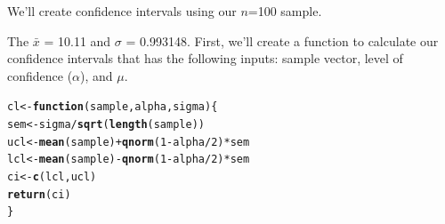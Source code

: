 \documentclass{tufte-handout}\usepackage[]{graphicx}\usepackage[]{color}
\makeatletter
\newcommand{\hlnum}[1]{\textcolor[rgb]{0.686,0.059,0.569}{#1}}%
\newcommand{\hlopt}[1]{\textcolor[rgb]{0,0,0}{#1}}%
\newcommand{\hlstd}[1]{\textcolor[rgb]{0.345,0.345,0.345}{#1}}%
\newcommand{\hlkwa}[1]{\textcolor[rgb]{0.161,0.373,0.58}{\textbf{#1}}}%
\newcommand{\hlkwb}[1]{\textcolor[rgb]{0.69,0.353,0.396}{#1}}%
\newcommand{\hlkwc}[1]{\textcolor[rgb]{0.333,0.667,0.333}{#1}}%
\newcommand{\hlkwd}[1]{\textcolor[rgb]{0.737,0.353,0.396}{\textbf{#1}}}%
\newenvironment{kframe}{%
 \def\at@end@of@kframe{}%
 \ifinner\ifhmode%
  \def\at@end@of@kframe{\end{minipage}}%
  \begin{minipage}{\columnwidth}%
 \fi\fi%
 \def\FrameCommand##1{\hskip\@totalleftmargin \hskip-\fboxsep
 \colorbox{shadecolor}{##1}\hskip-\fboxsep
     \hskip-\linewidth \hskip-\@totalleftmargin \hskip\columnwidth}%
 \MakeFramed {\advance\hsize-\width
   \@totalleftmargin\z@ \linewidth\hsize
   \@setminipage}}%
 {\par\unskip\endMakeFramed%
 \at@end@of@kframe}
\newenvironment{knitrout}{}{} %
\makeatother
\begin{document}
We'll create confidence intervals using our $n$=100 sample. 

The $\bar{x}$ = 10.11 and $\sigma$ = 0.993148. First, we'll create a function to calculate our confidence intervals that has the following inputs: sample vector, level of confidence ($\alpha$), and $\mu$.

\begin{knitrout}
\color{fgcolor}\begin{kframe}
\begin{alltt}
\hlstd{cl}\hlkwb{<-} \hlkwa{function}\hlstd{(}\hlkwc{sample}\hlstd{,} \hlkwc{alpha}\hlstd{,} \hlkwc{sigma}\hlstd{)\{}
  \hlstd{sem} \hlkwb{<-} \hlstd{sigma}\hlopt{/}\hlkwd{sqrt}\hlstd{(}\hlkwd{length}\hlstd{(sample))}
  \hlstd{ucl} \hlkwb{<-} \hlkwd{mean}\hlstd{(sample)} \hlopt{+} \hlkwd{qnorm}\hlstd{(}\hlnum{1}\hlopt{-}\hlstd{alpha}\hlopt{/}\hlnum{2}\hlstd{)}\hlopt{*}\hlstd{sem}
  \hlstd{lcl} \hlkwb{<-} \hlkwd{mean}\hlstd{(sample)} \hlopt{-} \hlkwd{qnorm}\hlstd{(}\hlnum{1}\hlopt{-}\hlstd{alpha}\hlopt{/}\hlnum{2}\hlstd{)}\hlopt{*}\hlstd{sem}
  \hlstd{ci} \hlkwb{<-} \hlkwd{c}\hlstd{(lcl, ucl)}
  \hlkwd{return}\hlstd{(ci)}
\hlstd{\}}


\end{alltt}
\end{kframe}
\end{knitrout}
\end{document}
